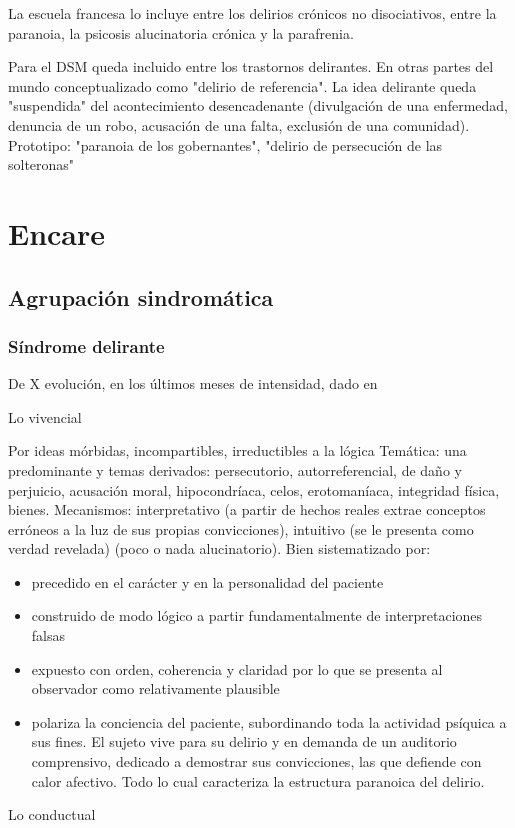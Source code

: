 \documentclass{scrbook}
\begin{document}
La escuela francesa lo incluye entre los delirios crónicos no disociativos, entre la paranoia, la psicosis alucinatoria crónica y la parafrenia.

Para el DSM queda incluido entre los trastornos delirantes. En otras partes del mundo conceptualizado como "delirio de referencia". La idea delirante queda "suspendida" del acontecimiento desencadenante (divulgación de una enfermedad, denuncia de un robo, acusación de una falta, exclusión de una comunidad). Prototipo: "paranoia de los gobernantes", "delirio de persecución de las solteronas"
\section*{Encare}
\subsection*{Agrupación sindromática}
\subsubsection*{Síndrome delirante}
De X evolución, en los últimos meses de intensidad, dado en

Lo vivencial

Por ideas mórbidas, incompartibles, irreductibles a la lógica Temática: una predominante y temas derivados: persecutorio, autorreferencial, de daño y perjuicio, acusación moral, hipocondríaca, celos, erotomaníaca, integridad física, bienes. Mecanismos: interpretativo (a partir de hechos reales extrae conceptos erróneos a la luz de sus propias convicciones), intuitivo (se le presenta como verdad revelada) (poco o nada alucinatorio). Bien sistematizado por:
\begin{itemize}
	\item precedido en el carácter y en la personalidad del paciente
	\item construido de modo lógico a partir fundamentalmente de interpretaciones falsas
	\item expuesto con orden, coherencia y claridad por lo que se presenta al observador como relativamente plausible
	\item polariza la conciencia del paciente, subordinando toda la actividad psíquica a sus fines. El sujeto vive para su delirio y en demanda de un auditorio comprensivo, dedicado a demostrar sus convicciones, las que defiende con calor afectivo. Todo lo cual caracteriza la estructura paranoica del delirio.
\end{itemize}
Lo conductual
\end{document}
